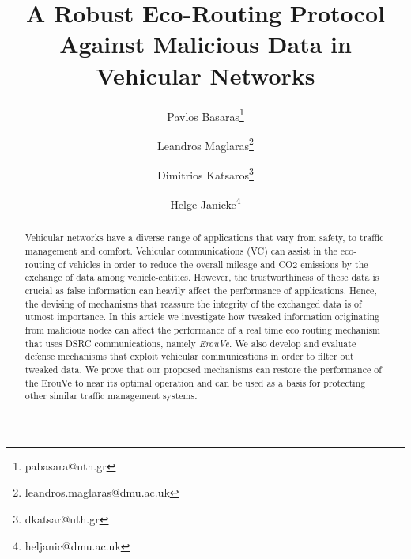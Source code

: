 \documentclass[conference]{IEEEtran}
\begin{document}
\title{A Robust Eco-Routing Protocol Against Malicious Data in Vehicular Networks}


\author[1]{Pavlos Basaras\thanks{pabasara@uth.gr}}
\author[2]{Leandros Maglaras\thanks{leandros.maglaras@dmu.ac.uk}}
\author[1]{Dimitrios Katsaros\thanks{dkatsar@uth.gr}}
\author[2]{Helge Janicke\thanks{heljanic@dmu.ac.uk}}

\renewcommand\Authands{ and }

\begin{comment}
\author{\IEEEauthorblockN{Pavlos Basaras, Dimitrios Katsaros}
\IEEEauthorblockA{Department of Computer \& Communication Engineering \\
University of Thessaly, Volos, Greece\\
Email: \{pabasara, dkatsar\}@inf.uth.gr}
\and
\IEEEauthorblockN{Leandros A. Maglaras and Helge Janicke}
\IEEEauthorblockA{School of Computer Science and Informatics \\
De Montfort University, Leicester, UK\\
Email: \{leandros.maglaras, heljanic\}@dmu.ac.uk}
}
\end{comment}

\maketitle

\begin{abstract}
Vehicular networks have a diverse range of applications that vary from safety, to traffic management and comfort. 
Vehicular communications (VC) can assist in the eco-routing of vehicles in order to reduce the overall mileage and CO2 emissions 
by the exchange of data among vehicle-entities. However, the trustworthiness of these data is crucial as false information can heavily affect
the performance of applications.  Hence, the devising of mechanisms that reassure the integrity of the exchanged data is of utmost importance.
In this article we investigate how tweaked information originating from malicious nodes can affect the performance of a real time eco routing mechanism that 
uses  DSRC communications, namely {\it ErouVe}. We also develop and evaluate defense mechanisms  that exploit vehicular communications in order to filter out tweaked 
data. We prove that our proposed mechanisms can restore the performance of the ErouVe to near its optimal operation and can be used as a basis for protecting 
other similar traffic management systems.
\end{abstract}
\end{document}
